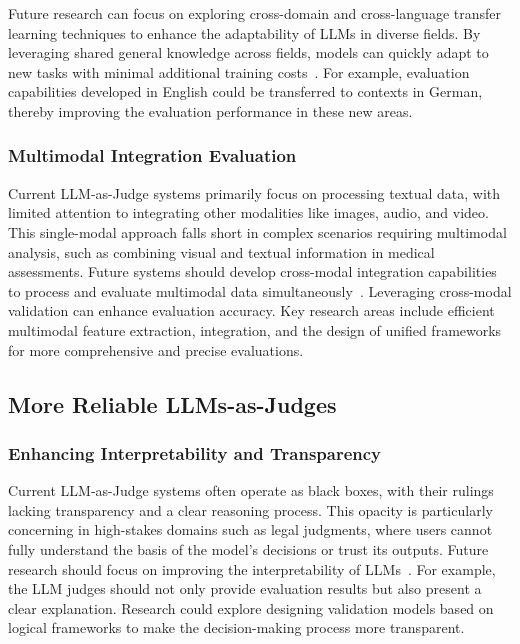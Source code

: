 Future research can focus on exploring cross-domain and cross-language transfer learning techniques to enhance the adaptability of LLMs in diverse fields. By leveraging shared general knowledge across fields, models can quickly adapt to new tasks with minimal additional training costs~\cite{son2024mm,hada2023large,watts2024pariksha}. For example, evaluation capabilities developed in English could be transferred to contexts in German, thereby improving the evaluation performance in these new areas.



\subsubsection{Multimodal Integration Evaluation}
Current LLM-as-Judge systems primarily focus on processing textual data, with limited attention to integrating other modalities like images, audio, and video. This single-modal approach falls short in complex scenarios requiring multimodal analysis, such as combining visual and textual information in medical assessments. Future systems should develop cross-modal integration capabilities to process and evaluate multimodal data simultaneously~\cite{chen2024mllm}. Leveraging cross-modal validation can enhance evaluation accuracy. Key research areas include efficient multimodal feature extraction, integration, and the design of unified frameworks for more comprehensive and precise evaluations.

\subsection{More Reliable LLMs-as-Judges}
\label{sec:more-Reliable}

\subsubsection{Enhancing Interpretability and Transparency}

Current LLM-as-Judge systems often operate as black boxes, with their rulings lacking transparency and a clear reasoning process. This opacity is particularly concerning in high-stakes domains such as legal judgments, where users cannot fully understand the basis of the model's decisions or trust its outputs.
Future research should focus on improving the interpretability of LLMs~\cite{liu2024hd}. For example, the LLM judges should not only provide evaluation results but also present a clear explanation. Research could explore designing validation models based on logical frameworks to make the decision-making process more transparent.

